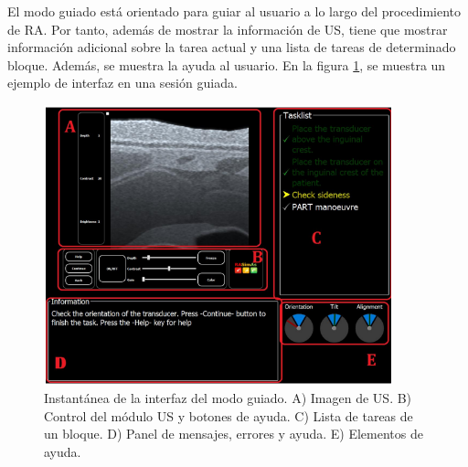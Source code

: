 El modo guiado está orientado para guiar al usuario a lo largo del procedimiento de \ac{RA}. Por tanto, además de mostrar la información de \ac{US}, tiene que mostrar información adicional sobre la tarea actual y una lista de tareas de determinado bloque. Además, se muestra la ayuda al usuario. En la figura \ref{fig:guidedui}, se muestra un ejemplo de interfaz en una sesión guiada.
\begin{figure}[h]
    \centering
    \includegraphics[width=0.9\textwidth]{IMG/guidedui.PNG}
    \caption{Instantánea de la interfaz del modo guiado. A) Imagen de \ac{US}. B) Control del módulo \ac{US} y botones de ayuda. C) Lista de tareas de un bloque. D) Panel de mensajes, errores y ayuda. E) Elementos de ayuda.}
    \label{fig:guidedui}
\end{figure}

